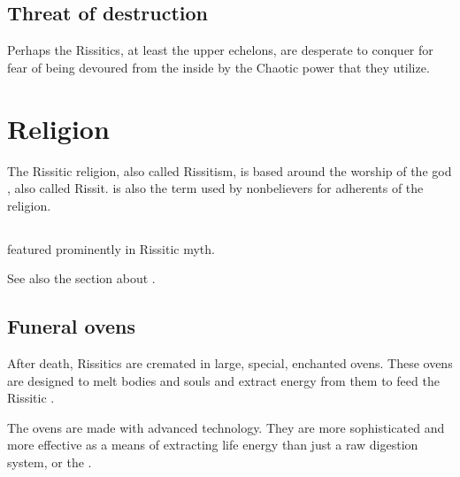 \subsection{Threat of destruction}
Perhaps the Rissitics, at least the upper echelons, are desperate to conquer for fear of being devoured from the inside by the Chaotic power that they utilize. 

















\section{Religion}
The Rissitic religion, also called Rissitism, is based around the worship of the god \HriistN, also called Rissit. 
 is also the term used by nonbelievers for adherents of the religion. 









\subsection{\Dragons}
\Dragons featured prominently in Rissitic myth. 

See also the section about . 









\subsection{Funeral ovens}
After death, Rissitics are cremated in large, special, enchanted ovens. 
These ovens are designed to melt bodies and souls and extract energy from them to feed the Rissitic \matrix. 

The ovens are made with advanced technology. 
They are more sophisticated and more effective as a means of extracting life energy than just a raw digestion system, or the \psp{\resphain} . 

